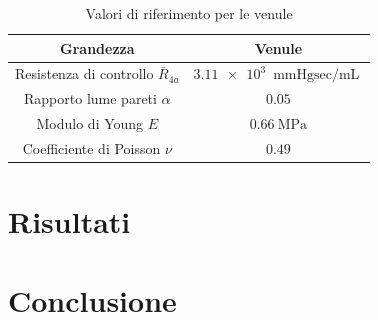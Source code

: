 \documentclass{article}
\begin{document}
\begin{table}[h!]
\begin{center}
\begin{tabular}{| c | c |}
\hline
\textbf{Grandezza} & \textbf{Venule}\\
\hline
Resistenza di controllo $\bar{R}_{4a}$ & $ \SI{3.11e3}{\mmHg \sec \per \milli \liter}$ \\
Rapporto lume pareti $\alpha$ & $0.05$\\
Modulo di Young $E$ & $\SI{0.66}{\mega\pascal}$\\
Coefficiente di Poisson $\nu$ & $0.49$\\
\hline
\end{tabular}
\caption{Valori di riferimento per le venule}
\label{tab_ven}
\end{center}
\end{table}


\section{Risultati}
\section{Conclusione}





\end{document}
